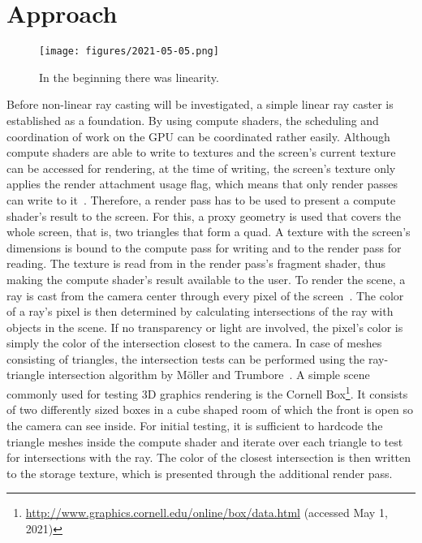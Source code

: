 \chapter{Approach}

\begin{figure}[!t]
  \centering
  \texttt{[image: figures/2021-05-05.png]}
  \caption{In the beginning there was linearity.}
  \label{fig:simple-cornell-box}
\end{figure}


\noindent Before non-linear ray casting will be investigated, a simple linear ray caster is established as a foundation.
By using compute shaders, the scheduling and coordination of work on the GPU can be coordinated rather easily.
Although compute shaders are able to write to textures and the screen's current texture can be accessed for rendering, at the time of writing, the screen's texture only applies the render attachment usage flag, which means that only render passes can write to it~\cite{malyshauWebGPU2021}.
Therefore, a render pass has to be used to present a compute shader's result to the screen.
For this, a proxy geometry is used that covers the whole screen, that is, two triangles that form a quad.
A texture with the screen's dimensions is bound to the compute pass for writing and to the render pass for reading.
The texture is read from in the render pass's fragment shader, thus making the compute shader's result available to the user.
To render the scene, a ray is cast from the camera center through every pixel of the screen~\cite{shirleyRayTracingOne2020}.
The color of a ray's pixel is then determined by calculating intersections of the ray with objects in the scene.
If no transparency or light are involved, the pixel's color is simply the color of the intersection closest to the camera.
In case of meshes consisting of triangles, the intersection tests can be performed using the ray-triangle intersection algorithm by Möller and Trumbore~\cite{mollerFastMinimumStorage1997}.
A simple scene commonly used for testing 3D graphics rendering is the Cornell Box\footnote{\url{http://www.graphics.cornell.edu/online/box/data.html} (accessed May 1, 2021)}.
It consists of two differently sized boxes in a cube shaped room of which the front is open so the camera can see inside.
For initial testing, it is sufficient to hardcode the triangle meshes inside the compute shader and iterate over each triangle to test for intersections with the ray.
The color of the closest intersection is then written to the storage texture, which is presented through the additional render pass.
